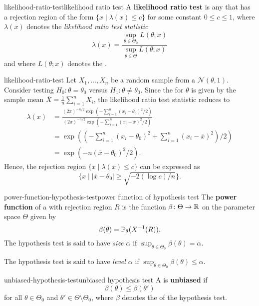 \begin{topic}{likelihood-ratio-test}{likelihood ratio test}
    A \textbf{likelihood ratio test} is any  that has a rejection region of the form $\{ x \mid \lambda(x) \le c \}$ for some constant $0 \le c \le 1$, where $\lambda(x)$ denotes the \textit{likelihood ratio test statistic}
    \[ \lambda(x) = \frac{\sup_{\theta \in \Theta_0} L(\theta; x)}{\sup_{\theta \in \Theta} L(\theta; x)} \]
    and where $L(\theta; x)$ denotes the .
\end{topic}

\begin{example}{likelihood-ratio-test}
    Let $X_1, \ldots, X_n$ be a random sample from a  $\mathcal{N}(\theta, 1)$. Consider testing $H_0 : \theta = \theta_0$ versus $H_1 : \theta \ne \theta_0$.
    Since the  for $\theta$ is given by the sample mean $\overline{X} = \frac{1}{n} \sum_{i = 1}^{n} X_i$, the likelihood ratio test statistic reduces to
    \[ \begin{aligned}
        \lambda(x) &= \frac{(2 \pi)^{-n/2} \exp \left( - \sum_{i = 1}^{n} (x_i - \theta_0)^2 / 2 \right)}{(2 \pi)^{-n/2} \exp \left( - \sum_{i = 1}^{n} (x_i - \overline{x})^2 / 2 \right)} \\
        &= \exp \left( \left( - \sum_{i = 1}^{n} (x_i - \theta_0)^2 + \sum_{i = 1}^{n} (x_i - \overline{x})^2 \right) / 2 \right) \\ 
        &= \exp \left( - n (\overline{x} - \theta_0)^2 / 2 \right) .
    \end{aligned} \]
    Hence, the rejection region $\{ x \mid \lambda(x) \le c \}$ can be expressed as
    \[ \{ x \mid |\overline{x} - \theta_0| \ge \sqrt{- 2 (\log c) / n} \} . \]
\end{example}

\begin{topic}{power-function-hypothesis-test}{power function of hypothesis test}
    The \textbf{power function} of a  with rejection region $R$ is the function $\beta \colon \Theta \to \mathbb{R}$ on the parameter space $\Theta$ given by
    \[ \beta(\theta) = \mathbb{P}_\theta(X^{-1}(R)) . \]
    The hypothesis test is said to have \textit{size $\alpha$} if $\sup_{\theta \in \Theta_0} \beta(\theta) = \alpha$.

    The hypothesis test is said to have \textit{level $\alpha$} if $\sup_{\theta \in \Theta_0} \beta(\theta) \le \alpha$.
\end{topic}

\begin{topic}{unbiased-hypothesis-test}{unbiased hypothesis test}
    A  is \textbf{unbiased} if
    \[ \beta(\theta) \le \beta(\theta') \]
    for all $\theta \in \Theta_0$ and $\theta' \in \Theta \setminus \Theta_0$, where $\beta$ denotes the  of the hypothesis test.
\end{topic}

